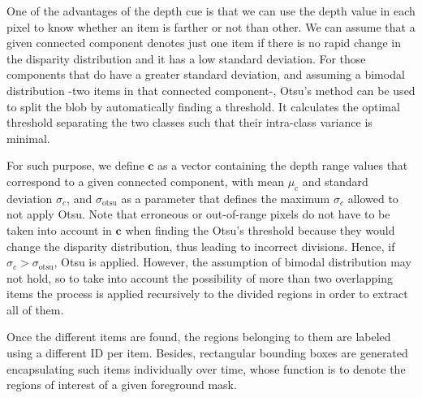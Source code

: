 \documentclass[10pt,twocolumn,letterpaper]{article}
\begin{document}
One of the advantages of the depth cue is that we can use the depth value in each pixel to know whether an item is farther or not than other. We can assume that a given connected component denotes just one item if there is no rapid change in the disparity distribution and it has a low standard deviation. For those components that do have a greater standard deviation, and assuming a bimodal distribution -two items in that connected component-, Otsu's method \cite{otsu1975threshold} can be used to split the blob by automatically finding a threshold. It calculates the optimal threshold separating the two classes such that their intra-class variance is minimal. 


For such purpose, we define $\mathbf{c}$ as a vector containing the depth range values that correspond to a given connected component, with mean $\mu_{c}$ and standard deviation $\sigma_{c}$, and $\sigma_\mathrm{otsu}$ as a parameter that defines the maximum $\sigma_{c}$ allowed to not apply Otsu. Note that erroneous or out-of-range pixels do not have to be taken into account in $\mathbf{c}$ when finding the Otsu's threshold because they would change the disparity distribution, thus leading to incorrect divisions. Hence, if $\sigma_{c} > \sigma_\mathrm{otsu}$, Otsu is applied. However, the assumption of bimodal distribution may not hold, so to take into account the possibility of more than two overlapping items the process is applied recursively to the divided regions in order to extract all of them. 

Once the different items are found, the regions belonging to them are labeled using a different ID per item. Besides, rectangular bounding boxes are generated encapsulating such items individually over time, whose function is to denote the regions of interest of a given foreground mask. 

\end{document}
